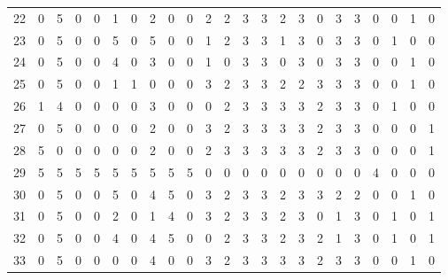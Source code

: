 \begin{table}[htbp]
{\begin{tabular}{lllllllllllllllllllllll}
22                  & 0 & 5 & 0 & 0 & 1 & 0 & 2 & 0 & 0 & 2 & 2 & 3 & 3 & 2 & 3 & 0 & 3 & 3 & 0                  & 0                   & 1                   & 0                   \\
23                  & 0 & 5 & 0 & 0 & 5 & 0 & 5 & 0 & 0 & 1 & 2 & 3 & 3 & 1 & 3 & 0 & 3 & 3 & 0                  & 1                   & 0                   & 0                   \\
24                  & 0 & 5 & 0 & 0 & 4 & 0 & 3 & 0 & 0 & 1 & 0 & 3 & 3 & 0 & 3 & 0 & 3 & 3 & 0                  & 0                   & 1                   & 0                   \\
25                  & 0 & 5 & 0 & 0 & 1 & 1 & 0 & 0 & 0 & 3 & 2 & 3 & 3 & 2 & 2 & 3 & 3 & 3 & 0                  & 0                   & 1                   & 0                   \\
26                  & 1 & 4 & 0 & 0 & 0 & 0 & 3 & 0 & 0 & 0 & 2 & 3 & 3 & 3 & 3 & 2 & 3 & 3 & 0                  & 1                   & 0                   & 0                   \\
27                  & 0 & 5 & 0 & 0 & 0 & 0 & 2 & 0 & 0 & 3 & 2 & 3 & 3 & 3 & 3 & 2 & 3 & 3 & 0                  & 0                   & 0                   & 1                   \\
28                  & 5 & 0 & 0 & 0 & 0 & 0 & 2 & 0 & 0 & 2 & 3 & 3 & 3 & 3 & 3 & 2 & 3 & 3 & 0                  & 0                   & 0                   & 1                   \\
29                  & 5 & 5 & 5 & 5 & 5 & 5 & 5 & 5 & 5 & 0 & 0 & 0 & 0 & 0 & 0 & 0 & 0 & 0 & 4                  & 0                   & 0                   & 0                   \\
30                  & 0 & 5 & 0 & 0 & 5 & 0 & 4 & 5 & 0 & 3 & 2 & 3 & 3 & 2 & 3 & 3 & 2 & 2 & 0                  & 0                   & 1                   & 0                   \\
31                  & 0 & 5 & 0 & 0 & 2 & 0 & 1 & 4 & 0 & 3 & 2 & 3 & 3 & 2 & 3 & 0 & 1 & 3 & 0                  & 1                   & 0                   & 1                   \\
32                  & 0 & 5 & 0 & 0 & 4 & 0 & 4 & 5 & 0 & 0 & 2 & 3 & 3 & 2 & 3 & 2 & 1 & 3 & 0                  & 1                   & 0                   & 1                   \\
33                  & 0 & 5 & 0 & 0 & 0 & 0 & 4 & 0 & 0 & 3 & 2 & 3 & 3 & 3 & 3 & 2 & 3 & 3 & 0                  & 0                   & 1                   & 0                   \\

\end{tabular}}
\end{table}
